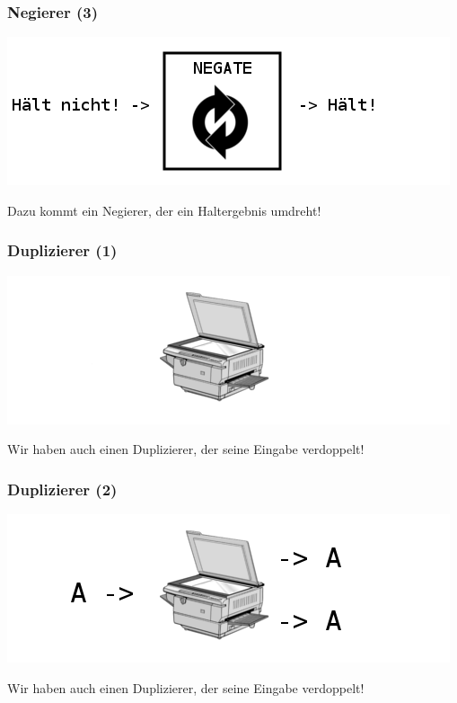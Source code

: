 \documentclass[aspectratio=169]{beamer}
\begin{document}

\begin{frame}
\frametitle{Negierer (3)}
\begin{center}
\includegraphics[scale=1.4]{images/erklaerung06.png}
\bigskip

Dazu kommt ein Negierer, der ein Haltergebnis umdreht!
\end{center}
\end{frame}


\begin{frame}
\frametitle{Duplizierer (1)}
\begin{center}
\includegraphics[scale=1.4]{images/copy_alone.png} 
\bigskip

Wir haben auch einen Duplizierer, der seine Eingabe verdoppelt!
\end{center}
\end{frame}


\begin{frame}
\frametitle{Duplizierer (2)}
\begin{center}
\includegraphics[scale=1.4]{images/erklaerung07.png}
\bigskip

Wir haben auch einen Duplizierer, der seine Eingabe verdoppelt!
\end{center}
\end{frame}
\end{document}
